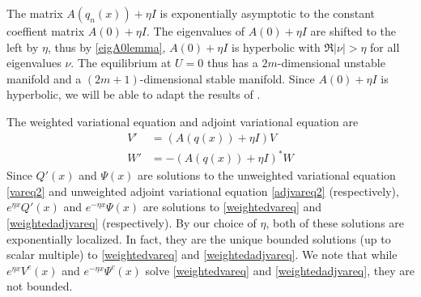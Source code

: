 \documentclass[thesis.tex]{subfiles}
\begin{document}
The matrix $A(q_n(x)) + \eta I$ is exponentially asymptotic to the constant coeffient matrix $A(0) + \eta I$. The eigenvalues of $A(0) + \eta I$ are shifted to the left by $\eta$, thus by \ref{eigA0lemma}, $A(0) + \eta I$ is hyperbolic with $\Re|\nu| > \eta$ for all eigenvalues $\nu$. The equilibrium at $U = 0$ thus has a $2m$-dimensional unstable manifold and a $(2m+1)$-dimensional stable manifold. Since $A(0) + \eta I$ is hyperbolic, we will be able to adapt the results of \cite{Sandstede1998}. 

The weighted variational equation and adjoint variational equation are
\begin{align}
V' &= (A(q(x)) + \eta I)V \label{weightedvareq} \\
W' &= -(A(q(x)) + \eta I)^* W \label{weightedadjvareq}
\end{align}
Since $Q'(x)$ and $\Psi(x)$ are solutions to the unweighted variational equation \cref{vareq2} and unweighted adjoint variational equation \cref{adjvareq2} (respectively), $e^{\eta x}Q'(x)$ and $e^{-\eta x}\Psi(x)$ are solutions to \cref{weightedvareq} and \cref{weightedadjvareq} (respectively). By our choice of $\eta$, both of these solutions are exponentially localized. In fact, they are the unique bounded solutions (up to scalar multiple) to \cref{weightedvareq} and \cref{weightedadjvareq}. We note that while $e^{\eta x} V^c(x)$ and $e^{-\eta x}\Psi^c(x)$ solve \cref{weightedvareq} and \cref{weightedadjvareq}, they are not bounded.









\iffulldocument\else
	
	
\fi
\end{document}
